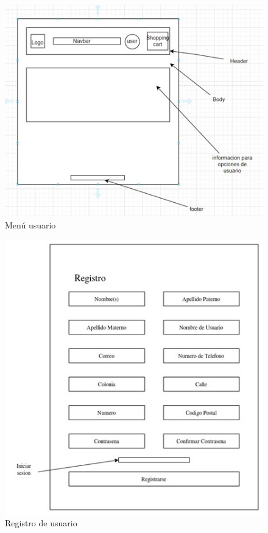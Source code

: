 \documentclass{article}
\begin{document}
\begin{figure}
    \centering
    \includegraphics[width=1.1\linewidth]{3.5.jpg}
    \caption{Menú usuario}
    \label{fig:enter-label}
\end{figure}
\begin{figure}
    \centering
    \includegraphics[width=1.1\linewidth]{4.jpg}
    \caption{Registro de usuario}
    \label{fig:enter-label}
\end{figure}
\end{document}
